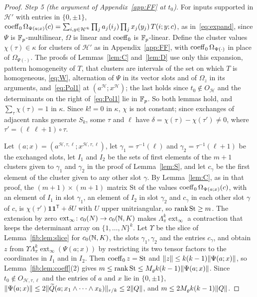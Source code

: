 \begin{proof}
\emph{Step 5 (the argument of Appendix~\ref{app:FF} at $t_0$).} For inputs supported in $\mathcal H'$ with entries in
$\{0,\pm1\}$,
$\operatorname{coeff}_0\Omega_{\Psi(a;x)}(c)=\sum_{i,y\in\mathcal H'^k}\prod_ja_j(i_j)\prod_jx_j(y_j)\,T(i;y;c)$, as
in~\eqref{eq:expand}, since $\Psi$ is $\mathbb F_p$\nobreakdash-multilinear, $\Omega$ is linear and $\operatorname{coeff}_0$ is
$\mathbb F_p$\nobreakdash-linear. Define the cluster values $\chi(\tau)\in\kappa$ for clusters of $\mathcal H'$ as in
Appendix~\ref{app:FF}, with $\operatorname{coeff}_0\Omega_{\Psi(\cdot)}$ in place of $\Omega_{\Psi(\cdot)}$. The proofs of
Lemmas~\ref{lem:C} and~\ref{lem:D} use only this expansion, pattern homogeneity of $T$, that clusters are intervals of
the set on which $T$ is homogeneous, \eqref{eq:W}, alternation of $\Psi$ in its vector slots and of $\Omega_z$ in its
arguments, and~\eqref{eq:Pol1} at $(a^{\mathcal H};x^{\mathcal H})$; the last holds since $t_0\notin O_{\mathcal H}$ and
the determinants on the right of~\eqref{eq:Pol1} lie in $\mathbb F_p$. So both lemmas hold, and $\sum_\tau\chi(\tau)=1$ in
$\kappa$. Since $k!=0$ in $\kappa$, $\chi$ is not constant; since exchanges of adjacent ranks generate $S_k$, some $\tau$
and $\ell$ have $\delta=\chi(\tau)-\chi(\tau')\ne0$, where $\tau'=(\ell\ \ell{+}1)\circ\tau$.

Let $(a;x)=(a^{\mathcal H,\tau,\ell};x^{\mathcal H,\tau,\ell})$, let $\gamma_1=\tau^{-1}(\ell)$ and
$\gamma_2=\tau^{-1}(\ell+1)$ be the exchanged slots, let $I_1$ and $I_2$ be the sets of first elements of the $m+1$
clusters given to $\gamma_1$ and $\gamma_2$ in the proof of Lemma~\ref{lem:S}, and let $c_\gamma$ be the first element
of the cluster given to any other slot $\gamma$. By Lemma~\ref{lem:C}, as in that proof, the $(m+1)\times(m+1)$ matrix
$\mathrm{St}$ of the values $\operatorname{coeff}_0\Omega_{\Psi(a;x)}(c)$, with an element of $I_1$ in slot $\gamma_1$, an element of
$I_2$ in slot $\gamma_2$ and $c_\gamma$ in each other slot $\gamma$ of $c$, is
$\chi(\tau')\mathbf 1\mathbf 1^{\mathsf T}+\delta U$ with $U$ upper unitriangular, so $\operatorname{rank}\mathrm{St}\ge m$. The
extension by zero $\operatorname{ext}_\infty\colon c_0(N)\to c_0(\mathbb N,K)$ makes $\Lambda^k_\pi\operatorname{ext}_\infty$
a contraction that keeps the determinant array on $\{1,\dots,N\}^k$. Let $\Upsilon$ be the slice of
Lemma~\ref{fib:lem:slice} for $c_0(\mathbb N,K)$, the slots $\gamma_1,\gamma_2$ and the entries $c_\gamma$, and obtain $z$
from $\Upsilon\Lambda^k_\pi\operatorname{ext}_\infty(\Psi(a;x))$ by restricting its two tensor factors to the
coordinates in $I_1$ and in $I_2$. Then $\operatorname{coeff}_0z=\mathrm{St}$ and $\lVert z\rVert\le k(k-1)\lVert \Psi(a;x)\rVert$, so
Lemma~\ref{fib:lem:coeff}(2) gives $m\le\operatorname{rank}\mathrm{St}\le M_\varrho k(k-1)\lVert \Psi(a;x)\rVert$. Since
$t_0\notin O_{\mathcal H,\tau,\ell}$ and the entries of $a$ and $x$ lie in $\{0,\pm1\}$,
$\lVert \Psi(a;x)\rVert\le2\lVert \widetilde Q(a;x_1\wedge\dots\wedge x_k)\rVert_{r/k}\le2\lVert Q\rVert$, and $m\le2M_\varrho k(k-1)\lVert Q\rVert$.
\end{proof}

